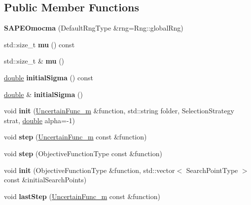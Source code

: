 \subsection*{Public Member Functions}
\begin{DoxyCompactItemize}
\item 
{\bfseries S\+A\+P\+E\+Omocma} (Default\+Rng\+Type \&rng=Rng\+::global\+Rng)\hypertarget{classSAPEOmocma_a34a1f1b7cc1095c04083956fef334a76}{}\label{classSAPEOmocma_a34a1f1b7cc1095c04083956fef334a76}

\item 
std\+::size\+\_\+t {\bfseries mu} () const \hypertarget{classSAPEOmocma_a92989cd62fb5f5c8f25934fea86ed531}{}\label{classSAPEOmocma_a92989cd62fb5f5c8f25934fea86ed531}

\item 
std\+::size\+\_\+t \& {\bfseries mu} ()\hypertarget{classSAPEOmocma_a5c1b63233adf2034a52ccb93753b71f9}{}\label{classSAPEOmocma_a5c1b63233adf2034a52ccb93753b71f9}

\item 
\hyperlink{classdouble}{double} {\bfseries initial\+Sigma} () const \hypertarget{classSAPEOmocma_ab205921b7c121c0b260a2938df64adfd}{}\label{classSAPEOmocma_ab205921b7c121c0b260a2938df64adfd}

\item 
\hyperlink{classdouble}{double} \& {\bfseries initial\+Sigma} ()\hypertarget{classSAPEOmocma_ac0c4de753cd6583ce5c00f6af38ec364}{}\label{classSAPEOmocma_ac0c4de753cd6583ce5c00f6af38ec364}

\item 
void {\bfseries init} (\hyperlink{classUncertainFunc__m}{Uncertain\+Func\+\_\+m} \&function, std\+::string folder, Selection\+Strategy strat, \hyperlink{classdouble}{double} alpha=-\/1)\hypertarget{classSAPEOmocma_ae9b2d6fb35846f34e6bee03165d86869}{}\label{classSAPEOmocma_ae9b2d6fb35846f34e6bee03165d86869}

\item 
void {\bfseries step} (\hyperlink{classUncertainFunc__m}{Uncertain\+Func\+\_\+m} const \&function)\hypertarget{classSAPEOmocma_ab37544f2de0dcd163307b978b01b5c40}{}\label{classSAPEOmocma_ab37544f2de0dcd163307b978b01b5c40}

\item 
void {\bfseries step} (Objective\+Function\+Type const \&function)\hypertarget{classSAPEOmocma_adbd17849f95f84cfde1e201a56235667}{}\label{classSAPEOmocma_adbd17849f95f84cfde1e201a56235667}

\item 
void {\bfseries init} (Objective\+Function\+Type \&function, std\+::vector$<$ Search\+Point\+Type $>$ const \&initial\+Search\+Points)\hypertarget{classSAPEOmocma_a676d1b6a2ac4db3ede8d16dd1a1a8f46}{}\label{classSAPEOmocma_a676d1b6a2ac4db3ede8d16dd1a1a8f46}

\item 
void {\bfseries last\+Step} (\hyperlink{classUncertainFunc__m}{Uncertain\+Func\+\_\+m} const \&function)\hypertarget{classSAPEOmocma_a82f994fd4be8d7f17a33c79a4d218af3}{}\label{classSAPEOmocma_a82f994fd4be8d7f17a33c79a4d218af3}

\end{DoxyCompactItemize}
